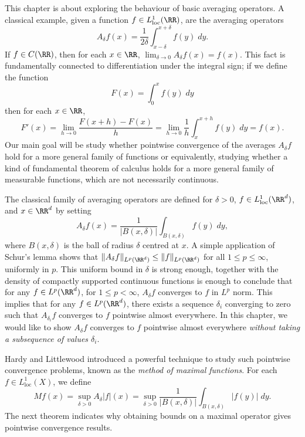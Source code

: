 This chapter is about exploring the behaviour of basic averaging operators. A classical example, given a function $f \in L^1_{\text{loc}}(\RR)$, are the averaging operators
%
\[ A_\delta f(x) = \frac{1}{2\delta} \int_{x-\delta}^{x+\delta} f(y)\; dy. \]
%
If $f \in C(\RR)$, then for each $x \in \RR$, $\lim_{\delta \to 0} A_\delta f(x) = f(x)$. This fact is fundamentally connected to differentiation under the integral sign; if we define the function
%
\[ F(x) = \int_0^x f(y)\; dy \]
%
then for each $x \in \RR$,
%
\[ F'(x) = \lim_{h \to 0} \frac{F(x+h) - F(x)}{h} = \lim_{h \to 0} \frac{1}{h} \int_x^{x+h} f(y)\; dy = f(x). \]
%
Our main goal will be study whether pointwise convergence of the averages $A_\delta f$ hold for a more general family of functions or equivalently, studying whether a kind of fundamental theorem of calculus holds for a more general family of measurable functions, which are not necessarily continuous.


The classical family of averaging operators are defined for $\delta > 0$, $f \in L^1_{\text{loc}}(\RR^d)$, and $x \in \RR^d$ by setting
%
\[ A_\delta f(x) = \frac{1}{|B(x,\delta)|} \int_{B(x,\delta)} f(y)\; dy, \]
%
where $B(x,\delta)$ is the ball of radius $\delta$ centred at $x$. A simple application of Schur's lemma shows that $\| A_\delta f \|_{L^p(\RR^d)} \leq \| f \|_{L^p(\RR^d)}$ for all $1 \leq p \leq \infty$, uniformly in $p$. This uniform bound in $\delta$ is strong enough, together with the density of compactly supported continuous functions is enough to conclude that for any $f \in L^p(\RR^d)$, for $1 \leq p < \infty$, $A_\delta f$ converges to $f$ in $L^p$ norm. This implies that for any $f \in L^p(\RR^d)$, there exists a sequence $\delta_i$ converging to zero such that $A_{\delta_i} f$ converges to $f$ pointwise almost everywhere. In this chapter, we would like to show $A_\delta f$ converges to $f$ pointwise almost everywhere \emph{without taking a subsequence of values $\delta_i$}.

Hardy and Littlewood introduced a powerful technique to study such pointwise convergence problems, known as the \emph{method of maximal functions}. For each $f \in L^1_{\text{loc}}(X)$, we define
%
\[ Mf(x) = \sup_{\delta > 0} A_\delta |f|(x) = \sup_{\delta > 0} \frac{1}{|B(x,\delta)|} \int_{B(x,\delta)} |f(y)|\; dy. \]
%
The next theorem indicates why obtaining bounds on a maximal operator gives pointwise convergence results.


